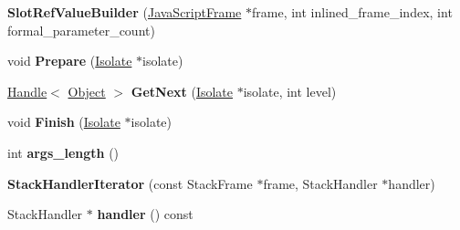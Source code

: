 \begin{DoxyCompactItemize}
\item 
\hypertarget{classv8_1_1internal_1_1_b_a_s_e___e_m_b_e_d_d_e_d_af619a61adc81bc0aa3c89e66fc47ed1e}{}{\bfseries Slot\+Ref\+Value\+Builder} (\hyperlink{classv8_1_1internal_1_1_java_script_frame}{Java\+Script\+Frame} $\ast$frame, int inlined\+\_\+frame\+\_\+index, int formal\+\_\+parameter\+\_\+count)\label{classv8_1_1internal_1_1_b_a_s_e___e_m_b_e_d_d_e_d_af619a61adc81bc0aa3c89e66fc47ed1e}

\item 
\hypertarget{classv8_1_1internal_1_1_b_a_s_e___e_m_b_e_d_d_e_d_a4ac8c420e596eef402739fcb3de40d30}{}void {\bfseries Prepare} (\hyperlink{classv8_1_1internal_1_1_isolate}{Isolate} $\ast$isolate)\label{classv8_1_1internal_1_1_b_a_s_e___e_m_b_e_d_d_e_d_a4ac8c420e596eef402739fcb3de40d30}

\item 
\hypertarget{classv8_1_1internal_1_1_b_a_s_e___e_m_b_e_d_d_e_d_a7dce8998a2b33644d9c5da6ea133e5b6}{}\hyperlink{classv8_1_1internal_1_1_handle}{Handle}$<$ \hyperlink{classv8_1_1internal_1_1_object}{Object} $>$ {\bfseries Get\+Next} (\hyperlink{classv8_1_1internal_1_1_isolate}{Isolate} $\ast$isolate, int level)\label{classv8_1_1internal_1_1_b_a_s_e___e_m_b_e_d_d_e_d_a7dce8998a2b33644d9c5da6ea133e5b6}

\item 
\hypertarget{classv8_1_1internal_1_1_b_a_s_e___e_m_b_e_d_d_e_d_af557707fdaae16571c5902565f900505}{}void {\bfseries Finish} (\hyperlink{classv8_1_1internal_1_1_isolate}{Isolate} $\ast$isolate)\label{classv8_1_1internal_1_1_b_a_s_e___e_m_b_e_d_d_e_d_af557707fdaae16571c5902565f900505}

\item 
\hypertarget{classv8_1_1internal_1_1_b_a_s_e___e_m_b_e_d_d_e_d_acaeae5b6c5e71fcbda049b338c16b4d4}{}int {\bfseries args\+\_\+length} ()\label{classv8_1_1internal_1_1_b_a_s_e___e_m_b_e_d_d_e_d_acaeae5b6c5e71fcbda049b338c16b4d4}

\item 
\hypertarget{classv8_1_1internal_1_1_b_a_s_e___e_m_b_e_d_d_e_d_a90598e08b585026ee62a878375e486df}{}{\bfseries Stack\+Handler\+Iterator} (const Stack\+Frame $\ast$frame, Stack\+Handler $\ast$handler)\label{classv8_1_1internal_1_1_b_a_s_e___e_m_b_e_d_d_e_d_a90598e08b585026ee62a878375e486df}

\item 
\hypertarget{classv8_1_1internal_1_1_b_a_s_e___e_m_b_e_d_d_e_d_a5ad5d39de125dd9706a54356457900a2}{}Stack\+Handler $\ast$ {\bfseries handler} () const \label{classv8_1_1internal_1_1_b_a_s_e___e_m_b_e_d_d_e_d_a5ad5d39de125dd9706a54356457900a2}


\end{DoxyCompactItemize}
